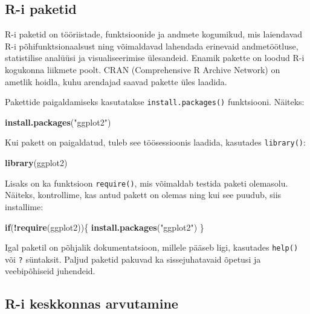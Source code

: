 \documentclass[
]{book}
\newenvironment{Shaded}{\begin{snugshade}}{\end{snugshade}}
\newcommand{\ControlFlowTok}[1]{\textcolor[rgb]{0.13,0.29,0.53}{\textbf{#1}}}
\newcommand{\FunctionTok}[1]{\textcolor[rgb]{0.13,0.29,0.53}{\textbf{#1}}}
\newcommand{\NormalTok}[1]{#1}
\newcommand{\SpecialCharTok}[1]{\textcolor[rgb]{0.81,0.36,0.00}{\textbf{#1}}}
\newcommand{\StringTok}[1]{\textcolor[rgb]{0.31,0.60,0.02}{#1}}
\renewenvironment{Shaded} {\begin{snugshade}\footnotesize} {\end{snugshade}}
\begin{document}
\subsection{R-i paketid}\label{r-i-paketid}

R-i paketid on tööriistade, funktsioonide ja andmete kogumikud, mis laiendavad R-i põhifunktsionaalsust ning võimaldavad lahendada erinevaid andmetöötluse, statistilise analüüsi ja visualiseerimise ülesandeid. Enamik pakette on loodud R-i kogukonna liikmete poolt. CRAN (Comprehensive R Archive Network) on ametlik hoidla, kuhu arendajad saavad pakette üles laadida.

Pakettide paigaldamiseks kasutatakse \texttt{install.packages()} funktsiooni. Näiteks:

\begin{Shaded}
\begin{Highlighting}[]
\FunctionTok{install.packages}\NormalTok{(}\StringTok{"ggplot2"}\NormalTok{)}
\end{Highlighting}
\end{Shaded}

Kui pakett on paigaldatud, tuleb see töösessioonis laadida, kasutades \texttt{library()}:

\begin{Shaded}
\begin{Highlighting}[]
\FunctionTok{library}\NormalTok{(ggplot2)}
\end{Highlighting}
\end{Shaded}

Lisaks on ka funktsioon \texttt{require()}, mis võimaldab testida paketi olemasolu. Näiteks, kontrollime, kas antud pakett on olemas ning kui see puudub, siis installime:

\begin{Shaded}
\begin{Highlighting}[]
\ControlFlowTok{if}\NormalTok{(}\SpecialCharTok{!}\FunctionTok{require}\NormalTok{(ggplot2))\{}
    \FunctionTok{install.packages}\NormalTok{(}\StringTok{"ggplot2"}\NormalTok{)    }
\NormalTok{\}}
\end{Highlighting}
\end{Shaded}

Igal paketil on põhjalik dokumentatsioon, millele pääseb ligi, kasutades \texttt{help()} või \texttt{?} süntaksit. Paljud paketid pakuvad ka sissejuhatavaid õpetusi ja veebipõhiseid juhendeid.

\subsection{R-i keskkonnas arvutamine}\label{r-i-keskkonnas-arvutamine}
\end{document}

